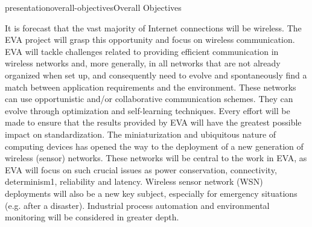 \documentclass{ra2016}
\begin{document}
%


\begin{module}{presentation}{overall-objectives}{Overall Objectives}

It is forecast that the vast majority of Internet connections will be wireless.
The EVA project will grasp this opportunity and focus on wireless communication.
EVA will tackle challenges related to providing efficient communication in wireless networks and, more generally, in all networks that are not already organized when set up, and consequently need to evolve and spontaneously find a match between application requirements and the environment.
These networks can use opportunistic and/or collaborative communication schemes.
They can evolve through optimization and self-learning techniques.
Every effort will be made to ensure that the results provided by EVA will have the greatest possible impact on standardization.
The miniaturization and ubiquitous nature of computing devices has opened the way to the deployment of a new generation of wireless (sensor) networks.
These networks will be central to the work in EVA, as EVA will focus on such crucial issues as power conservation, connectivity, determinism1, reliability and latency. Wireless sensor network (WSN) deployments will also be a new key subject, especially for emergency situations (e.g. after a
disaster).
Industrial process automation and environmental monitoring will be considered in greater depth.


\end{module}







\end{document}
